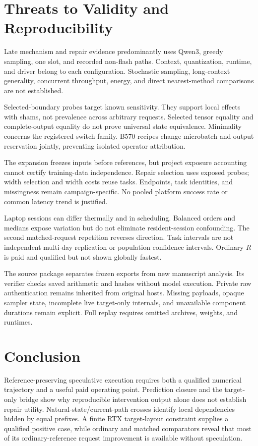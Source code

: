 \section{Threats to Validity and Reproducibility}
Late mechanism and repair evidence predominantly uses Qwen3, greedy sampling, one slot, and recorded non-flash paths. Context, quantization, runtime, and driver belong to each configuration. Stochastic sampling, long-context generality, concurrent throughput, energy, and direct nearest-method comparisons are not established.

Selected-boundary probes target known sensitivity. They support local effects with shams, not prevalence across arbitrary requests. Selected tensor equality and complete-output equality do not prove universal state equivalence. Minimality concerns the registered switch family. B570 recipes change microbatch and output reservation jointly, preventing isolated operator attribution.

The expansion freezes inputs before references, but project exposure accounting cannot certify training-data independence. Repair selection uses exposed probes; width selection and width costs reuse tasks. Endpoints, task identities, and missingness remain campaign-specific. No pooled platform success rate or common latency trend is justified.

Laptop sessions can differ thermally and in scheduling. Balanced orders and medians expose variation but do not eliminate resident-session confounding. The second matched-request repetition reverses direction. Task intervals are not independent multi-day replication or population confidence intervals. Ordinary $R$ is paid and qualified but not shown globally fastest.

The source package separates frozen exports from new manuscript analysis. Its verifier checks saved arithmetic and hashes without model execution. Private raw authentication remains inherited from original hosts. Missing payloads, opaque sampler state, incomplete live target-only internals, and unavailable component durations remain explicit. Full replay requires omitted archives, weights, and runtimes.

\section{Conclusion}
Reference-preserving speculative execution requires both a qualified numerical trajectory and a useful paid operating point. Prediction closure and the target-only bridge show why reproducible intervention output alone does not establish repair utility. Natural-state/current-path crosses identify local dependencies hidden by equal prefixes. A finite RTX target-layout constraint supplies a qualified positive case, while ordinary and matched comparators reveal that most of its ordinary-reference request improvement is available without speculation.

